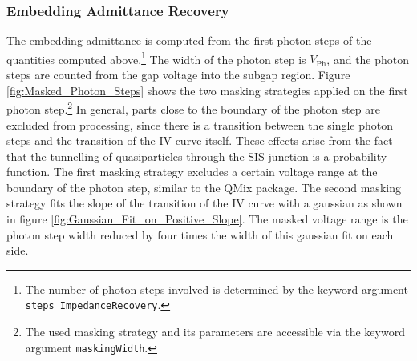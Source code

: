 \documentclass[]{article}
\begin{document}
\subsubsection{Embedding Admittance Recovery}
The embedding admittance is computed from the first photon steps of the quantities computed above.\footnote{The number of photon steps involved is determined by the keyword argument \texttt{steps\_ImpedanceRecovery}.} The width of the photon step is $V_\text{Ph}$, and the photon steps are counted from the gap voltage into the subgap region. Figure \ref{fig:Masked_Photon_Steps} shows the two masking strategies applied on the first photon step.\footnote{The used masking strategy and its parameters are accessible via the keyword argument \texttt{maskingWidth}.} In general, parts close to the boundary of the photon step are excluded from processing, since there is a transition between the single photon steps and the transition of the IV curve itself. These effects arise from the fact that the tunnelling of quasiparticles through the SIS junction is a probability function. The first masking strategy excludes a certain voltage range at the boundary of the photon step, similar to the QMix package. The second masking strategy fits the slope of the transition of the IV curve with a gaussian as shown in figure \ref{fig:Gaussian_Fit_on_Positive_Slope}. The masked voltage range is the photon step width reduced by four times the width of this gaussian fit on each side.
\end{document}
